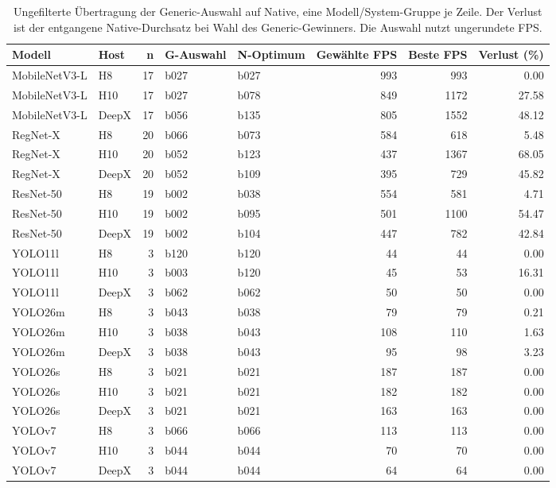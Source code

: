 \begin{table}[t]
\centering
\caption{Ungefilterte Übertragung der Generic-Auswahl auf Native, eine Modell/System-Gruppe je Zeile. Der Verlust ist der entgangene Native-Durchsatz bei Wahl des Generic-Gewinners. Die Auswahl nutzt ungerundete FPS.}
\label{tab:current-selection-groups}
\begingroup\small\setlength{\tabcolsep}{3pt}
\begin{tabular*}{\textwidth}{@{\extracolsep{\fill}}l l r l l r r r@{}}
\toprule
Modell & Host & n & G-Auswahl & N-Optimum & Gewählte FPS & Beste FPS & Verlust (\%) \\
\midrule
MobileNetV3-L & H8 & 17 & b027 & b027 & 993 & 993 & 0.00 \\
MobileNetV3-L & H10 & 17 & b027 & b078 & 849 & 1172 & 27.58 \\
MobileNetV3-L & DeepX & 17 & b056 & b135 & 805 & 1552 & 48.12 \\
RegNet-X & H8 & 20 & b066 & b073 & 584 & 618 & 5.48 \\
RegNet-X & H10 & 20 & b052 & b123 & 437 & 1367 & 68.05 \\
RegNet-X & DeepX & 20 & b052 & b109 & 395 & 729 & 45.82 \\
ResNet-50 & H8 & 19 & b002 & b038 & 554 & 581 & 4.71 \\
ResNet-50 & H10 & 19 & b002 & b095 & 501 & 1100 & 54.47 \\
ResNet-50 & DeepX & 19 & b002 & b104 & 447 & 782 & 42.84 \\
YOLO11l & H8 & 3 & b120 & b120 & 44 & 44 & 0.00 \\
YOLO11l & H10 & 3 & b003 & b120 & 45 & 53 & 16.31 \\
YOLO11l & DeepX & 3 & b062 & b062 & 50 & 50 & 0.00 \\
YOLO26m & H8 & 3 & b043 & b038 & 79 & 79 & 0.21 \\
YOLO26m & H10 & 3 & b038 & b043 & 108 & 110 & 1.63 \\
YOLO26m & DeepX & 3 & b038 & b043 & 95 & 98 & 3.23 \\
YOLO26s & H8 & 3 & b021 & b021 & 187 & 187 & 0.00 \\
YOLO26s & H10 & 3 & b021 & b021 & 182 & 182 & 0.00 \\
YOLO26s & DeepX & 3 & b021 & b021 & 163 & 163 & 0.00 \\
YOLOv7 & H8 & 3 & b066 & b066 & 113 & 113 & 0.00 \\
YOLOv7 & H10 & 3 & b044 & b044 & 70 & 70 & 0.00 \\
YOLOv7 & DeepX & 3 & b044 & b044 & 64 & 64 & 0.00 \\
\bottomrule
\end{tabular*}
\endgroup
\end{table}
